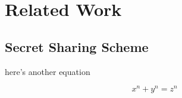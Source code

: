 \section{Related Work}
\subsection{Secret Sharing Scheme}
here's another equation

\[ x^n + y^n = z^n \]
